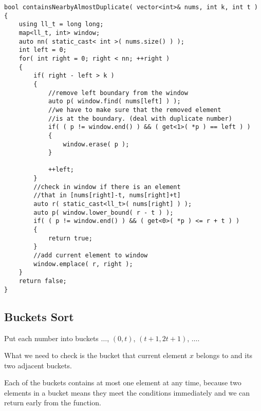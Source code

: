\setcounter{lstlisting}{0}
\begin{lstlisting}[style=customc, caption={TreeMap}]
bool containsNearbyAlmostDuplicate( vector<int>& nums, int k, int t )
{
    using ll_t = long long;
    map<ll_t, int> window;
    auto nn( static_cast< int >( nums.size() ) );
    int left = 0;
    for( int right = 0; right < nn; ++right )
    {
        if( right - left > k )
        {
            //remove left boundary from the window
            auto p( window.find( nums[left] ) );
            //we have to make sure that the removed element
            //is at the boundary. (deal with duplicate number)
            if( ( p != window.end() ) && ( get<1>( *p ) == left ) )
            {
                window.erase( p );
            }

            ++left;
        }
        //check in window if there is an element
        //that in [nums[right]-t, nums[right]+t]
        auto r( static_cast<ll_t>( nums[right] ) );
        auto p( window.lower_bound( r - t ) );
        if( ( p != window.end() ) && ( get<0>( *p ) <= r + t ) )
        {
            return true;
        }
        //add current element to window
        window.emplace( r, right );
    }
    return false;
}
\end{lstlisting}

\subsection{Buckets Sort}

Put each number into buckets $\ldots$, $(0, t)$, $(t+1, 2t+1)$, $\ldots$.

What we need to check is the bucket that current element $x$ belongs to and its two adjacent buckets. 

Each of the buckets contains at most one element at any time, because two elements in a bucket means they meet the conditions immediately and we can return early from the function.

